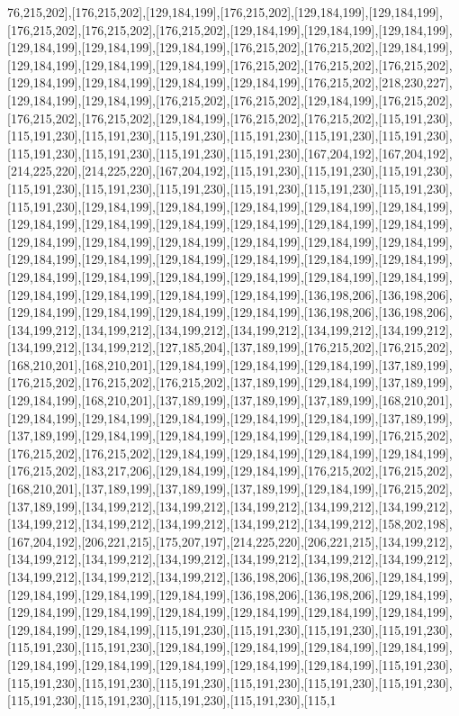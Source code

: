 76,215,202],[176,215,202],[129,184,199],[176,215,202],[129,184,199],[129,184,199],[176,215,202],[176,215,202],[176,215,202],[129,184,199],[129,184,199],[129,184,199],[129,184,199],[129,184,199],[129,184,199],[176,215,202],[176,215,202],[129,184,199],[129,184,199],[129,184,199],[129,184,199],[176,215,202],[176,215,202],[176,215,202],[129,184,199],[129,184,199],[129,184,199],[129,184,199],[176,215,202],[218,230,227],[129,184,199],[129,184,199],[176,215,202],[176,215,202],[129,184,199],[176,215,202],[176,215,202],[176,215,202],[129,184,199],[176,215,202],[176,215,202],[115,191,230],[115,191,230],[115,191,230],[115,191,230],[115,191,230],[115,191,230],[115,191,230],[115,191,230],[115,191,230],[115,191,230],[115,191,230],[167,204,192],[167,204,192],[214,225,220],[214,225,220],[167,204,192],[115,191,230],[115,191,230],[115,191,230],[115,191,230],[115,191,230],[115,191,230],[115,191,230],[115,191,230],[115,191,230],[115,191,230],[129,184,199],[129,184,199],[129,184,199],[129,184,199],[129,184,199],[129,184,199],[129,184,199],[129,184,199],[129,184,199],[129,184,199],[129,184,199],[129,184,199],[129,184,199],[129,184,199],[129,184,199],[129,184,199],[129,184,199],[129,184,199],[129,184,199],[129,184,199],[129,184,199],[129,184,199],[129,184,199],[129,184,199],[129,184,199],[129,184,199],[129,184,199],[129,184,199],[129,184,199],[129,184,199],[129,184,199],[129,184,199],[129,184,199],[136,198,206],[136,198,206],[129,184,199],[129,184,199],[129,184,199],[129,184,199],[136,198,206],[136,198,206],[134,199,212],[134,199,212],[134,199,212],[134,199,212],[134,199,212],[134,199,212],[134,199,212],[134,199,212],[127,185,204],[137,189,199],[176,215,202],[176,215,202],[168,210,201],[168,210,201],[129,184,199],[129,184,199],[129,184,199],[137,189,199],[176,215,202],[176,215,202],[176,215,202],[137,189,199],[129,184,199],[137,189,199],[129,184,199],[168,210,201],[137,189,199],[137,189,199],[137,189,199],[168,210,201],[129,184,199],[129,184,199],[129,184,199],[129,184,199],[129,184,199],[137,189,199],[137,189,199],[129,184,199],[129,184,199],[129,184,199],[129,184,199],[176,215,202],[176,215,202],[176,215,202],[129,184,199],[129,184,199],[129,184,199],[129,184,199],[176,215,202],[183,217,206],[129,184,199],[129,184,199],[176,215,202],[176,215,202],[168,210,201],[137,189,199],[137,189,199],[137,189,199],[129,184,199],[176,215,202],[137,189,199],[134,199,212],[134,199,212],[134,199,212],[134,199,212],[134,199,212],[134,199,212],[134,199,212],[134,199,212],[134,199,212],[134,199,212],[158,202,198],[167,204,192],[206,221,215],[175,207,197],[214,225,220],[206,221,215],[134,199,212],[134,199,212],[134,199,212],[134,199,212],[134,199,212],[134,199,212],[134,199,212],[134,199,212],[134,199,212],[134,199,212],[136,198,206],[136,198,206],[129,184,199],[129,184,199],[129,184,199],[129,184,199],[136,198,206],[136,198,206],[129,184,199],[129,184,199],[129,184,199],[129,184,199],[129,184,199],[129,184,199],[129,184,199],[129,184,199],[129,184,199],[115,191,230],[115,191,230],[115,191,230],[115,191,230],[115,191,230],[115,191,230],[129,184,199],[129,184,199],[129,184,199],[129,184,199],[129,184,199],[129,184,199],[129,184,199],[129,184,199],[129,184,199],[115,191,230],[115,191,230],[115,191,230],[115,191,230],[115,191,230],[115,191,230],[115,191,230],[115,191,230],[115,191,230],[115,191,230],[115,191,230],[115,1